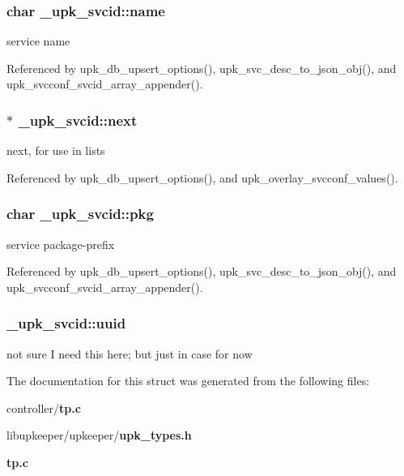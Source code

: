 \subsubsection[{name}]{\setlength{\rightskip}{0pt plus 5cm}char {\bf \_\-upk\_\-svcid::name}}\label{struct__upk__svcid_a3aa8414bbbad4602a7f1b2b5923a6ef1}
service name 

Referenced by upk\_\-db\_\-upsert\_\-options(), upk\_\-svc\_\-desc\_\-to\_\-json\_\-obj(), and upk\_\-svcconf\_\-svcid\_\-array\_\-appender().

\subsubsection[{next}]{ $\ast$ {\bf \_\-upk\_\-svcid::next}}\label{struct__upk__svcid_a925548c82b552cde7a1f29cf8ccd03d6}
next, for use in lists 

Referenced by upk\_\-db\_\-upsert\_\-options(), and upk\_\-overlay\_\-svcconf\_\-values().

\subsubsection[{pkg}]{\setlength{\rightskip}{0pt plus 5cm}char {\bf \_\-upk\_\-svcid::pkg}}\label{struct__upk__svcid_a341ff782303a90b58311264377c6de48}
service package-\/prefix 

Referenced by upk\_\-db\_\-upsert\_\-options(), upk\_\-svc\_\-desc\_\-to\_\-json\_\-obj(), and upk\_\-svcconf\_\-svcid\_\-array\_\-appender().

\subsubsection[{uuid}]{ {\bf \_\-upk\_\-svcid::uuid}}\label{struct__upk__svcid_a3b7d5a1866b60ecac8ea4dabe871dfbe}
not sure I need this here; but just in case for now 

The documentation for this struct was generated from the following files:\begin{DoxyCompactItemize}
\item 
controller/{\bf tp.c}\item 
libupkeeper/upkeeper/{\bf upk\_\-types.h}\item 
{\bf tp.c}\end{DoxyCompactItemize}
